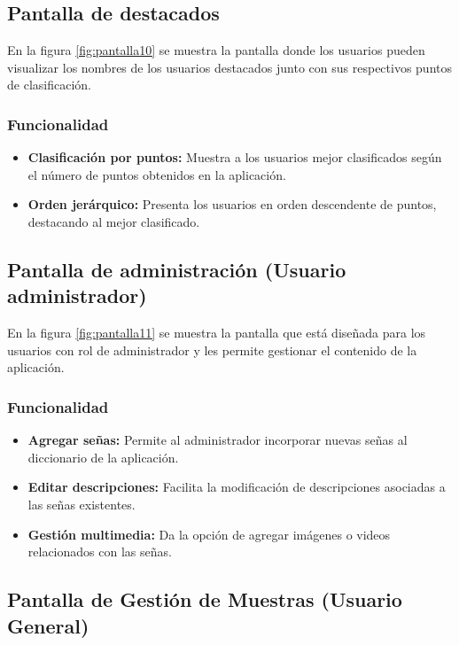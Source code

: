 \subsection{Pantalla de destacados}


En la figura \ref{fig:pantalla10} se muestra la pantalla donde los usuarios pueden visualizar los nombres de los usuarios destacados junto con sus respectivos puntos de clasificación.

\subsubsection{Funcionalidad}
\begin{itemize}
    \item \textbf{Clasificación por puntos:} Muestra a los usuarios mejor clasificados según el número de puntos obtenidos en la aplicación.
    \item \textbf{Orden jerárquico:} Presenta los usuarios en orden descendente de puntos, destacando al mejor clasificado.
\end{itemize}
\subsection{Pantalla de administración (Usuario administrador)}


En la figura \ref{fig:pantalla11} se muestra la pantalla que está diseñada para los usuarios con rol de administrador y les permite gestionar el contenido de la aplicación.

\subsubsection{Funcionalidad}
\begin{itemize}
    \item \textbf{Agregar señas:} Permite al administrador incorporar nuevas señas al diccionario de la aplicación.
    \item \textbf{Editar descripciones:} Facilita la modificación de descripciones asociadas a las señas existentes.
    \item \textbf{Gestión multimedia:} Da la opción de agregar imágenes o videos relacionados con las señas.
\end{itemize}

\subsection{Pantalla de Gestión de Muestras (Usuario General)}

